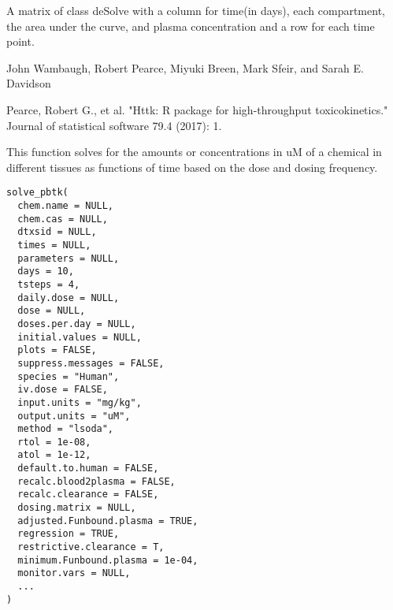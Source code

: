 \documentclass[a4paper]{book}
\begin{document}
%
\begin{Value}
A matrix of class deSolve with a column for time(in days), each
compartment, the area under the curve, and plasma concentration and a row
for each time point.
\end{Value}
%
\begin{Author}\relax
John Wambaugh, Robert Pearce, Miyuki Breen, Mark Sfeir, and
Sarah E. Davidson
\end{Author}
%
\begin{References}\relax
Pearce, Robert G., et al. "Httk: R package for high-throughput
toxicokinetics." Journal of statistical software 79.4 (2017): 1.
\end{References}
\graphicspath{{"C:/Users/jwambaug/git/httk/httk/man/figures/"}}
%
\begin{Description}\relax
This function solves for the amounts or concentrations in uM of a chemical
in different tissues as functions of time based on the dose and dosing
frequency.
\end{Description}
%
\begin{Usage}
\begin{verbatim}
solve_pbtk(
  chem.name = NULL,
  chem.cas = NULL,
  dtxsid = NULL,
  times = NULL,
  parameters = NULL,
  days = 10,
  tsteps = 4,
  daily.dose = NULL,
  dose = NULL,
  doses.per.day = NULL,
  initial.values = NULL,
  plots = FALSE,
  suppress.messages = FALSE,
  species = "Human",
  iv.dose = FALSE,
  input.units = "mg/kg",
  output.units = "uM",
  method = "lsoda",
  rtol = 1e-08,
  atol = 1e-12,
  default.to.human = FALSE,
  recalc.blood2plasma = FALSE,
  recalc.clearance = FALSE,
  dosing.matrix = NULL,
  adjusted.Funbound.plasma = TRUE,
  regression = TRUE,
  restrictive.clearance = T,
  minimum.Funbound.plasma = 1e-04,
  monitor.vars = NULL,
  ...
)
\end{verbatim}
\end{Usage}
%
\end{document}
